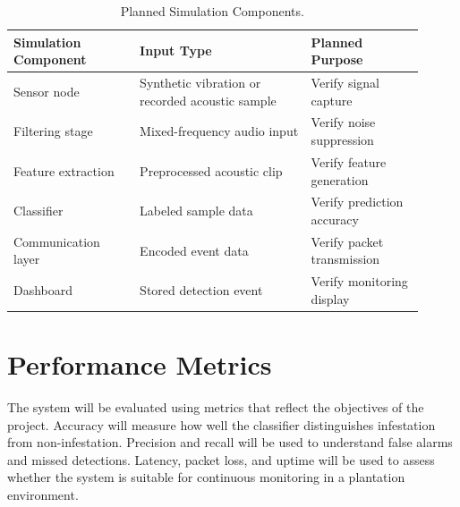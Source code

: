 \documentclass[12pt,a4paper,oneside]{memoir}
\begin{document}
\begin{table}[h]
\centering
\caption{Planned Simulation Components.}
\label{tab:simulation}
\renewcommand{\arraystretch}{1.3}
\begin{tabular}{@{} p{0.28\linewidth} p{0.38\linewidth} p{0.25\linewidth} @{}}
\toprule
\textbf{Simulation Component} & \textbf{Input Type} & \textbf{Planned Purpose} \\
\midrule
Sensor node        & Synthetic vibration or recorded acoustic sample & Verify signal capture \\
Filtering stage    & Mixed-frequency audio input                     & Verify noise suppression \\
Feature extraction & Preprocessed acoustic clip                      & Verify feature generation \\
Classifier         & Labeled sample data                             & Verify prediction accuracy \\
Communication layer & Encoded event data                             & Verify packet transmission \\
Dashboard          & Stored detection event                          & Verify monitoring display \\
\bottomrule
\end{tabular}
\end{table}

\section{Performance Metrics}
\label{sec:PerformanceMetrics}

The system will be evaluated using metrics that reflect the objectives of the project. Accuracy will measure how well the classifier distinguishes infestation from non-infestation. Precision and recall will be used to understand false alarms and missed detections. Latency, packet loss, and uptime will be used to assess whether the system is suitable for continuous monitoring in a plantation environment.
\end{document}
